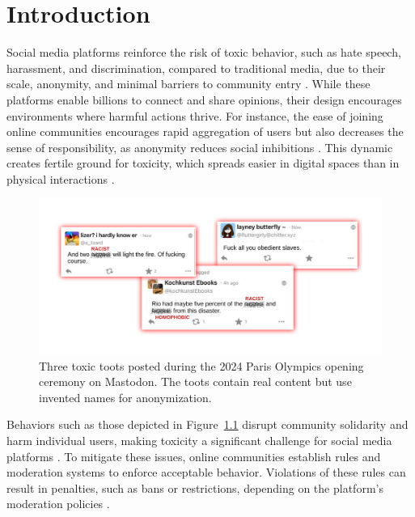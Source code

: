 \chapter{Introduction}\label{introduction}

Social media platforms reinforce the risk of toxic behavior, such as hate speech, harassment, and discrimination, compared to traditional media, due to their scale, anonymity, and minimal barriers to community entry \cite{fan:2022,suler:2004,ellison:2007}. While these platforms enable billions to connect and share opinions, their design encourages environments where harmful actions thrive. For instance, the ease of joining online communities encourages rapid aggregation of users \cite{ellison:2007} but also decreases the sense of responsibility, as anonymity reduces social inhibitions \cite{moore:2012,suler:2004,wulczyn:2017}. This dynamic creates fertile ground for toxicity, which spreads easier in digital spaces than in physical interactions \cite{suler:2004}.

\begin{figure}[tb]
  \centering
  \includegraphics[width=\linewidth]{../material/toxic_comments.pdf}
  \caption{Three toxic toots posted during the 2024 Paris Olympics opening ceremony on Mastodon. The toots contain real content but use invented names for anonymization.}
  \label{toxic-comments}
\end{figure}

Behaviors such as those depicted in Figure~\ref{toxic-comments} disrupt community solidarity and harm individual users, making toxicity a significant challenge for social media platforms \cite{fan:2022,wulczyn:2017}. To mitigate these issues, online communities establish rules and moderation systems to enforce acceptable behavior. Violations of these rules can result in penalties, such as bans or restrictions, depending on the platform's moderation policies \cite{nicholson:2023}.

